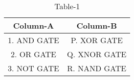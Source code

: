 \begin{table}[h!]
    \centering
    \begin{tabular}{|c|c|}
    \hline
        \textbf{Column-A} & \textbf{Column-B}  \\
        \hline
         1. AND GATE & P. XOR GATE \\
         2. OR GATE & Q. XNOR GATE \\
         3. NOT GATE & R. NAND GATE \\
         \hline
    \end{tabular}
    \caption{Table-1}
    \label{tab:tables/table.tex}
\end{table}